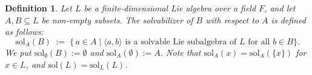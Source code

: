 \documentclass[11pt]{amsart}
\theoremstyle{plain}
\newtheorem{definition}{Definition}[section]
\def\sol{\mathrm{sol}}
\begin{document}


    


\begin{definition}\label{Sol-subset}
Let $L$ be a finite-dimensional Lie algebra over a field $F$,
and let $A, B\subseteq L$ be non-empty subsets.
The \emph{solvabilizer of $B$ with respect to $A$} is defined as follows: 
\[\sol_{A}(B)\;:=\;\bigl\{\,a\in A \mid \langle a,b\rangle
        \text{ is a solvable Lie subalgebra of }L
        \text{ for all }b\in B\bigr\}.\]
We put  
$\sol_{\emptyset}(B) := \emptyset$ and $\sol_{A}(\emptyset):=A$.
Note that $\sol_{A}(x) =\sol_{A}(\{x\})$ for $x\in L$, and $\sol(L) = \sol_{L}(L)$.
\end{definition}
\end{document}
